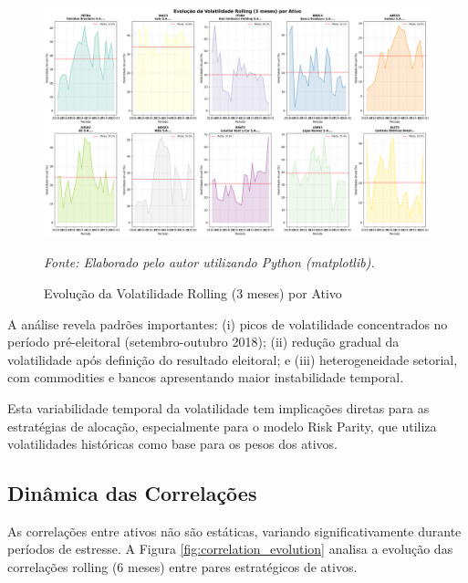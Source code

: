 \begin{figure}[H]
\centering
\includegraphics[width=\textwidth]{images/volatility_rolling.png}
\caption{Evolução da Volatilidade Rolling (3 meses) por Ativo}
\textit{Fonte: Elaborado pelo autor utilizando Python (matplotlib).}
\label{fig:volatility_rolling}
\end{figure}

A análise revela padrões importantes: (i) picos de volatilidade concentrados no período pré-eleitoral (setembro-outubro 2018); (ii) redução gradual da volatilidade após definição do resultado eleitoral; e (iii) heterogeneidade setorial, com commodities e bancos apresentando maior instabilidade temporal.

Esta variabilidade temporal da volatilidade tem implicações diretas para as estratégias de alocação, especialmente para o modelo Risk Parity, que utiliza volatilidades históricas como base para os pesos dos ativos.

\subsection{Dinâmica das Correlações}

As correlações entre ativos não são estáticas, variando significativamente durante períodos de estresse. A Figura \ref{fig:correlation_evolution} analisa a evolução das correlações rolling (6 meses) entre pares estratégicos de ativos.

